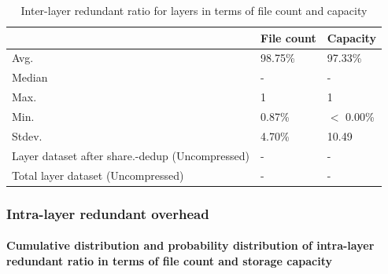 \begin{table} 
	\centering 
	\scriptsize  
	\caption{Inter-layer redundant ratio for layers in terms of file count and capacity} \label{tbl:across_ratio_layers} 
	\begin{tabular}{|l|l|l|}%
		\hline 
		& File count & Capacity \\
		\hline
		Avg. & 98.75\% & 97.33\%\\
		\hline
		Median & - & - \\
		\hline
		Max. & 1 & 1\\
		\hline
		Min.  & 0.87\%  & $<$ 0.00\%\\
		\hline
		Stdev.  &  4.70\% & 10.49\\
		\hline
		Layer dataset after share.-dedup (Uncompressed) & -  & -\\
		\hline 
		Total layer dataset (Uncompressed) &  -	& -\\
		\hline
	\end{tabular} 
\end{table}

\subsubsection{Intra-layer redundant overhead}

\paragraph{Cumulative distribution and probability distribution of intra-layer redundant ratio in terms of file count and storage capacity}

